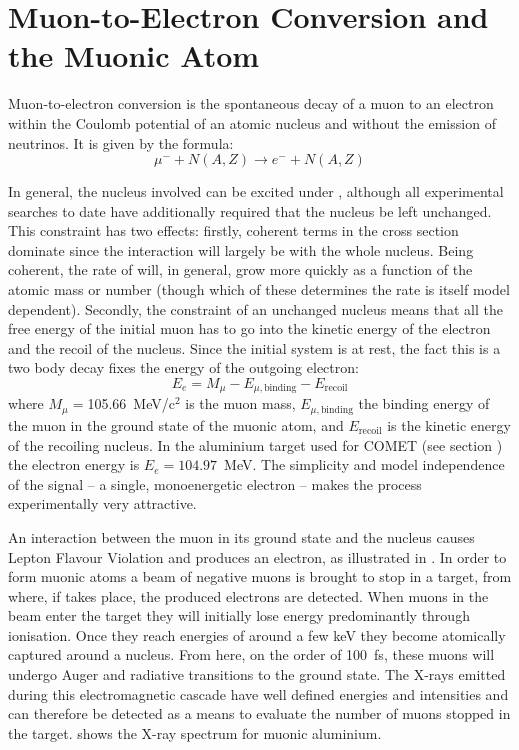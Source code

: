 
\chapter{Muon-to-Electron Conversion and the Muonic Atom}
Muon-to-electron conversion is the spontaneous decay of a muon to an electron within the Coulomb potential of an atomic nucleus and without the emission of neutrinos.
It is given by the formula:
\begin{equation}
\mu^{-}+N(A,Z) \rightarrow e^{-}+N(A,Z)
\end{equation}

In general, the nucleus involved can be excited under \mueconv, although all experimental searches to date have additionally required that the nucleus be left unchanged.
This constraint has two effects: firstly, coherent terms in the \mueconv cross section dominate since the interaction will largely be with the whole nucleus.
Being coherent, the rate of \mueconv will, in general, grow more quickly as a function of the atomic mass or number (though which of these determines the rate is itself model dependent).
Secondly, the constraint of an unchanged nucleus means that all the free energy of the initial muon has to go into the kinetic energy of the electron and the recoil of the nucleus.
Since the initial system is at rest, the fact this is a two body decay fixes the energy of the outgoing electron:
\begin{equation}
E_e=M_\mu-E_{\mu,\mathrm{binding}}-E_\mathrm{recoil}
\end{equation}
where $M_\mu=$105.66~MeV/c$^2$ is the muon mass, $E_{\mu,\mathrm{binding}}$ the
binding energy of the muon in the ground state of the muonic atom, and
$E_\mathrm{recoil}$ is the kinetic energy of the recoiling nucleus.
In the aluminium target used for COMET (see section ) the electron energy is $E_e=104.97$~MeV.
The simplicity and model independence of the signal -- a single, monoenergetic electron -- makes the process experimentally very attractive.

\FigMuecCreation
An interaction between the muon in its ground state and the nucleus causes Lepton Flavour Violation and produces an electron, as illustrated in .
In order to form muonic atoms a beam of negative muons is brought to stop in a target, from where, if \mueconv takes place, the produced electrons are detected.
When muons in the beam enter the target they will initially lose energy predominantly through ionisation.
Once they reach energies of around a few keV they become atomically captured around a nucleus.
From here, on the order of 100~fs, these muons will undergo Auger and radiative transitions to the ground state.
The X-rays emitted during this electromagnetic cascade have well defined energies and intensities and can therefore be detected as a means to evaluate the number of muons stopped in the target.
 shows the X-ray spectrum for muonic aluminium.

